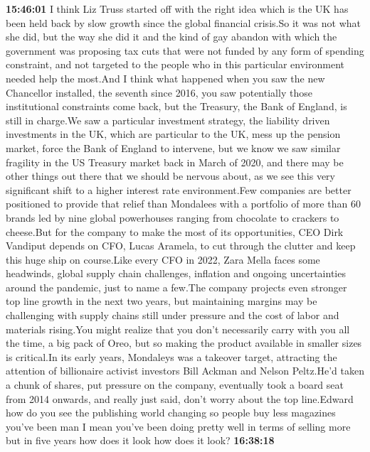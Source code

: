 \documentclass{article}%
\begin{document}
\textbf{15:46:01}%
\newline%
I think Liz Truss started off with the right idea which is the UK has been held back by slow growth since the global financial crisis.So it was not what she did, but the way she did it and the kind of gay abandon with which the government was proposing tax cuts that were not funded by any form of spending constraint, and not targeted to the people who in this particular environment needed help the most.And I think what happened when you saw the new Chancellor installed, the seventh since 2016, you saw potentially those institutional constraints come back, but the Treasury, the Bank of England, is still in charge.We saw a particular investment strategy, the liability driven investments in the UK, which are particular to the UK, mess up the pension market, force the Bank of England to intervene, but we know we saw similar fragility in the US Treasury market back in March of 2020, and there may be other things out there that we should be nervous about, as we see this very significant shift to a higher interest rate environment.Few companies are better positioned to provide that relief than Mondalees with a portfolio of more than 60 brands led by nine global powerhouses ranging from chocolate to crackers to cheese.But for the company to make the most of its opportunities, CEO Dirk Vandiput depends on CFO, Lucas Aramela, to cut through the clutter and keep this huge ship on course.Like every CFO in 2022, Zara Mella faces some headwinds, global supply chain challenges, inflation and ongoing uncertainties around the pandemic, just to name a few.The company projects even stronger top line growth in the next two years, but maintaining margins may be challenging with supply chains still under pressure and the cost of labor and materials rising.You might realize that you don't necessarily carry with you all the time, a big pack of Oreo, but so making the product available in smaller sizes is critical.In its early years, Mondaleys was a takeover target, attracting the attention of billionaire activist investors Bill Ackman and Nelson Peltz.He'd taken a chunk of shares, put pressure on the company, eventually took a board seat from 2014 onwards, and really just said, don't worry about the top line.Edward how do you see the publishing world changing so people buy less magazines you've been man I mean you've been doing pretty well in terms of selling more but in five years how does it look how does it look?%
\textbf{16:38:18}%
\newline%
\end{document}
